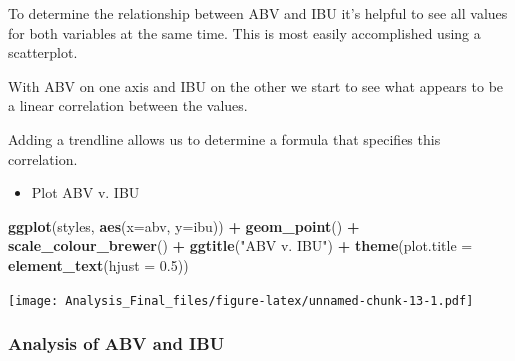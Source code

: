 \documentclass[]{article}
\newenvironment{Shaded}{\begin{snugshade}}{\end{snugshade}}
\newcommand{\KeywordTok}[1]{\textcolor[rgb]{0.13,0.29,0.53}{\textbf{#1}}}
\newcommand{\DataTypeTok}[1]{\textcolor[rgb]{0.13,0.29,0.53}{#1}}
\newcommand{\FloatTok}[1]{\textcolor[rgb]{0.00,0.00,0.81}{#1}}
\newcommand{\StringTok}[1]{\textcolor[rgb]{0.31,0.60,0.02}{#1}}
\newcommand{\CommentTok}[1]{\textcolor[rgb]{0.56,0.35,0.01}{\textit{#1}}}
\newcommand{\OperatorTok}[1]{\textcolor[rgb]{0.81,0.36,0.00}{\textbf{#1}}}
\newcommand{\NormalTok}[1]{#1}
\providecommand{\tightlist}{%
  \setlength{\itemsep}{0pt}\setlength{\parskip}{0pt}}
\begin{document}
To determine the relationship between ABV and IBU it's helpful to see
all values for both variables at the same time. This is most easily
accomplished using a scatterplot.

With ABV on one axis and IBU on the other we start to see what appears
to be a linear correlation between the values.

Adding a trendline allows us to determine a formula that specifies this
correlation.

\begin{Shaded}
\end{Shaded}

\begin{itemize}
\tightlist
\item
  Plot ABV v. IBU
\end{itemize}

\begin{Shaded}
\begin{Highlighting}[]
\KeywordTok{ggplot}\NormalTok{(styles, }\KeywordTok{aes}\NormalTok{(}\DataTypeTok{x=}\NormalTok{abv, }\DataTypeTok{y=}\NormalTok{ibu)) }\OperatorTok{+}
\StringTok{  }\KeywordTok{geom_point}\NormalTok{() }\OperatorTok{+}
\StringTok{  }\KeywordTok{scale_colour_brewer}\NormalTok{() }\OperatorTok{+}
\StringTok{  }\KeywordTok{ggtitle}\NormalTok{(}\StringTok{"ABV v. IBU"}\NormalTok{) }\OperatorTok{+}
\StringTok{  }\KeywordTok{theme}\NormalTok{(}\DataTypeTok{plot.title =} \KeywordTok{element_text}\NormalTok{(}\DataTypeTok{hjust =} \FloatTok{0.5}\NormalTok{))}
\end{Highlighting}
\end{Shaded}

\texttt{[image: Analysis\_Final\_files/figure-latex/unnamed-chunk-13-1.pdf]}

\subsubsection{Analysis of ABV and IBU}\label{analysis-of-abv-and-ibu}
\end{document}
